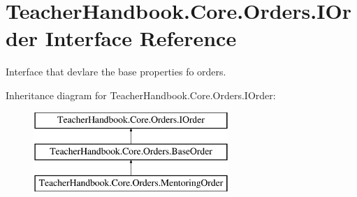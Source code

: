 \hypertarget{interface_teacher_handbook_1_1_core_1_1_orders_1_1_i_order}{}\section{Teacher\+Handbook.\+Core.\+Orders.\+I\+Order Interface Reference}
\label{interface_teacher_handbook_1_1_core_1_1_orders_1_1_i_order}


Interface that devlare the base properties fo orders.  


Inheritance diagram for Teacher\+Handbook.\+Core.\+Orders.\+I\+Order\+:\begin{figure}[H]
\begin{center}
\leavevmode
\includegraphics[height=3.000000cm]{df/d8a/interface_teacher_handbook_1_1_core_1_1_orders_1_1_i_order}
\end{center}
\end{figure}
